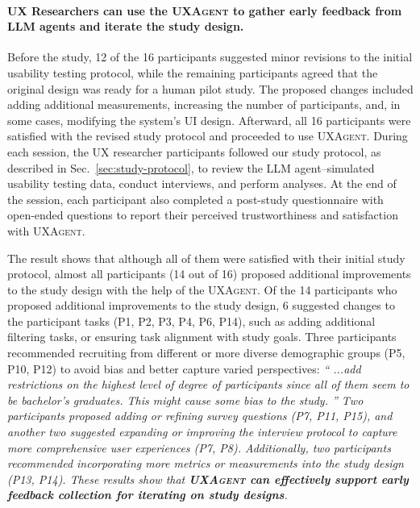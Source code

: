\documentclass[manuscript,review,anonymous]{acmart}
\let\oldquote\quote
\let\oldendquote\endquote
\renewenvironment{quote}[1][]{
\def\speakername{#1}%
\oldquote
\itshape
``}{''
\normalshape
\hfill\ifthenelse{\equal{\speakername}{}}{}{(\speakername)}
\oldendquote
}
\DeclareRobustCommand{\projectname}{\textsc{UXAgent}\xspace}
\begin{document}
\paragraph{\textbf{UX Researchers can use the \projectname to gather early feedback from LLM agents and iterate the study design.}}

Before the study, 12 of the 16 participants suggested minor revisions to the initial usability testing protocol, while the remaining participants agreed that the original design was ready for a human pilot study.
The proposed changes included adding additional measurements, increasing the number of participants, and, in some cases, modifying the system’s UI design.
Afterward, all 16 participants were satisfied with the revised study protocol and proceeded to use \projectname.
During each session, the UX researcher participants followed our study protocol, as described in Sec.~\ref{sec:study-protocol}, to review the LLM agent–simulated usability testing data, conduct interviews, and perform analyses.
At the end of the session, each participant also completed a post-study questionnaire with open-ended questions to report their perceived trustworthiness and satisfaction with \projectname.

The result shows that although all of them were satisfied with their initial study protocol, almost all participants (14 out of 16) proposed additional improvements to the study design with the help of the \projectname.
Of the 14 participants who proposed additional improvements to the study design, 6 suggested changes to the participant tasks (P1, P2, P3, P4, P6, P14), such as adding additional filtering tasks, or ensuring task alignment with study goals.
Three participants recommended recruiting from different or more diverse demographic groups (P5, P10, P12) to avoid bias and better capture varied perspectives:
\begin{quote}[P5]
...add restrictions on the highest level of degree of participants since all of them seem to be bachelor's graduates. This might cause some bias to the study.
\end{quote}
Two participants proposed adding or refining survey questions (P7, P11, P15), and another two suggested expanding or improving the interview protocol to capture more comprehensive user experiences (P7, P8).
Additionally, two participants recommended incorporating more metrics or measurements into the study design (P13, P14).
These results show that \textbf{\projectname{} can effectively support early feedback collection for iterating on study designs}.
\end{document}
